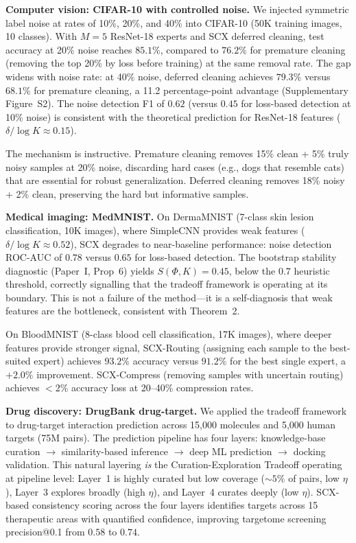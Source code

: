 \documentclass[12pt,a4paper]{article}
\begin{document}
\textbf{Computer vision: CIFAR-10 with controlled noise.} We injected symmetric label noise at rates of 10\%, 20\%, and 40\% into CIFAR-10 (50K training images, 10 classes). With $M=5$ ResNet-18 experts and SCX deferred cleaning, test accuracy at 20\% noise reaches $85.1\%$, compared to $76.2\%$ for premature cleaning (removing the top 20\% by loss before training) at the same removal rate. The gap widens with noise rate: at 40\% noise, deferred cleaning achieves $79.3\%$ versus $68.1\%$ for premature cleaning, a 11.2 percentage-point advantage (Supplementary Figure~S2). The noise detection F1 of $0.62$ (versus $0.45$ for loss-based detection at 10\% noise) is consistent with the theoretical prediction for ResNet-18 features ($\delta/\log K \approx 0.15$).

The mechanism is instructive. Premature cleaning removes 15\% clean + 5\% truly noisy samples at 20\% noise, discarding hard cases (e.g., dogs that resemble cats) that are essential for robust generalization. Deferred cleaning removes 18\% noisy + 2\% clean, preserving the hard but informative samples.

\textbf{Medical imaging: MedMNIST.} On DermaMNIST (7-class skin lesion classification, 10K images), where SimpleCNN provides weak features ($\delta/\log K \approx 0.52$), SCX degrades to near-baseline performance: noise detection ROC-AUC of $0.78$ versus $0.65$ for loss-based detection. The bootstrap stability diagnostic (Paper~I, Prop~6) yields $S(\Phi, K) = 0.45$, below the $0.7$ heuristic threshold, correctly signalling that the tradeoff framework is operating at its boundary. This is not a failure of the method---it is a self-diagnosis that weak features are the bottleneck, consistent with Theorem~2.

On BloodMNIST (8-class blood cell classification, 17K images), where deeper features provide stronger signal, SCX-Routing (assigning each sample to the best-suited expert) achieves $93.2\%$ accuracy versus $91.2\%$ for the best single expert, a $+2.0\%$ improvement. SCX-Compress (removing samples with uncertain routing) achieves $<2\%$ accuracy loss at 20--40\% compression rates.

\textbf{Drug discovery: DrugBank drug-target.} We applied the tradeoff framework to drug-target interaction prediction across 15,000 molecules and 5,000 human targets (75M pairs). The prediction pipeline has four layers: knowledge-base curation $\rightarrow$ similarity-based inference $\rightarrow$ deep ML prediction $\rightarrow$ docking validation. This natural layering \emph{is} the Curation-Exploration Tradeoff operating at pipeline level: Layer~1 is highly curated but low coverage ($\sim5\%$ of pairs, low $\eta$), Layer~3 explores broadly (high $\eta$), and Layer~4 curates deeply (low $\eta$). SCX-based consistency scoring across the four layers identifies targets across 15 therapeutic areas with quantified confidence, improving targetome screening precision@0.1 from $0.58$ to $0.74$.
\end{document}
